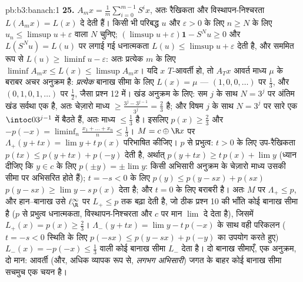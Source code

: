 \begin{solution}{pb:b3:banach:1}
\textbf{25.} $A_mx = \frac1m\sum_{i=0}^{m-1}S^ix$, अतः रैखिकता और विस्थापन-निश्चरता $L(A_mx) = L(x)$ दे देती
हैं। किसी भी परिबद्ध $u$ और $\varepsilon > 0$ के लिए $n \geq N$ के लिए $u_n \leq
\limsup u + \varepsilon$ वाला
$N$ चुनिए; $(\limsup u + \varepsilon)\mathbf 1 - S^Nu \geq 0$ और $L(S^Nu) = L(u)$ पर लगाई गई धनात्मकता $L(u) \leq \limsup u + \varepsilon$ देती है, और
सममित रूप से $L(u) \geq \liminf u - \varepsilon$: अतः प्रत्येक $m$ के लिए $\liminf A_mx \leq L(x) \leq \limsup A_mx$। यदि $x$
$T$-आवर्ती हो, तो $A_Tx$ आवर्त माध्य $\mu$ के बराबर अचर अनुक्रम है:
\emph{प्रत्येक} बानाख सीमा के लिए $L(x) = \mu$ --- $(1,0,0,\dots)$ पर $\frac13$, और $(0,1,0,1,\dots)$
पर $\frac12$, जैसा प्रश्न 12 में। खंड अनुक्रम के लिए: सम $j$ के साथ
$N = 3^j$ पर अंतिम खंड सर्वथा एक है, अतः चेज़ारो माध्य $\geq \frac{3^j - 3^{j-1}}{3^j} = \frac23$ है; और विषम
$j$ के साथ $N = 3^j$ पर सारे एक $\intoc0
{3^{j-1}}$ में बैठते हैं, अतः माध्य $\leq \frac13$
है। इसलिए $p(x) \geq
\frac23$ और $-p(-x) = \liminf_n\frac{x_1 + \dots + x_n}n
\leq \frac13$। $M = c \oplus \R x$ पर $\Lambda_+(y +
tx) = \lim y + t\,p(x)$ परिभाषित कीजिए। $p$ से
प्रभुत्व: $t > 0$ के लिए उप-रैखिकता $p(tx) \leq p(y + tx) + p(-y)$ देती है, अर्थात् $p(y + tx) \geq t\,p(x) + \lim y$ (ध्यान
दीजिए कि $y \in c$ के लिए $p(\pm y) = \pm\lim
y$: किसी अभिसारी अनुक्रम के चेज़ारो माध्य
उसकी सीमा पर अभिसरित होते हैं); $t = -s < 0$ के लिए $p(y) \leq p(y -
sx) + p(sx)$ $p(y - sx) \geq \lim y - s\,p(x)$ देता है;
और $t
= 0$ के लिए बराबरी है। अतः $M$ पर $\Lambda_+ \leq p$, और हान--बानाख उसे
$\ell^\infty_\R$ पर $L_+ \leq p$ तक बढ़ा देती है, जो ठीक प्रश्न 10 की भाँति कोई बानाख
सीमा है ($p$ से प्रभुत्व धनात्मकता, विस्थापन-निश्चरता और $c$
पर मान $\lim$ दे देता है), जिसमें $L_+(x) = p(x) \geq \frac23$। $\Lambda_-(y + tx) = \lim y - t\,p(-x)$ के साथ वही परिकलन
($t = -s
< 0$ स्थिति के लिए $p(-sx) \leq p(y - sx) + p(-y)$ का उपयोग करते हुए) $L_-(x) = -p(-x) \leq
\frac13$ वाली कोई बानाख
सीमा $L_-$ देता है। दो बानाख सीमाएँ, एक अनुक्रम, दो मान: आवर्ती (और,
अधिक व्यापक रूप से, \emph{लगभग अभिसारी}) जगत के बाहर कोई बानाख सीमा
सचमुच एक चयन है।
\end{solution}
